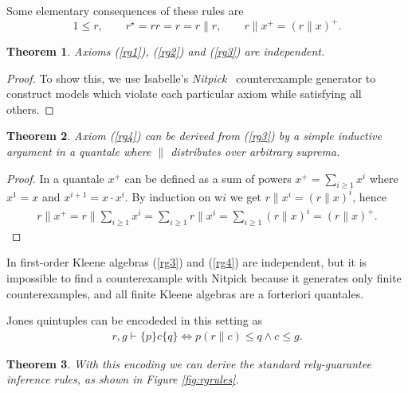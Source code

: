 \documentclass{llncs}
\newtheorem{thm}{Theorem}
\begin{document}
Some elementary consequences of these rules are
\begin{equation*}
1 \le r,\qquad
r^\star = rr = r = r\|r,\qquad
r\|x^+ = (r\|x)^+.
\end{equation*}

\begin{thm}
  Axioms (\ref{rg1}), (\ref{rg2}) and (\ref{rg3}) are independent.
\end{thm}
\begin{proof}
  To show this, we use Isabelle's
  \emph{Nitpick}~\cite{blanchette_nitpick:_2010} counterexample
  generator to construct models which violate each particular axiom
  while satisfying all others.
\end{proof}

\begin{thm}
Axiom (\ref{rg4}) can be derived from (\ref{rg3}) by a simple
inductive argument in a quantale where $\|$ distributes over arbitrary suprema.
\end{thm}
\begin{proof}
  In a quantale $x^+$ can be defined as a sum of powers
  $x^+=\sum_{i\ge 1} x^i$ where $x^1=x$ and $x^{i+1}=x\cdot x^i$. By
  induction on w$i$ we get $r\|x^i = (r\|x)^i$, hence
  \begin{align*}
    r\|x^+ = r\|\sum_{i\ge 1} x^i = \sum_{i\ge 1} r\|x^i = \sum_{i\ge 1} (r\|x)^i = (r\|x)^+.
  \end{align*}
\end{proof}

In first-order Kleene algebras (\ref{rg3}) and (\ref{rg4}) are
independent, but it is impossible to find a counterexample with
Nitpick because it generates only finite counterexamples, and all
finite Kleene algebras are a forteriori quantales.

Jones quintuples can be encodeded in this setting as
\begin{align}
r, g \vdash \{p\} c \{q\} \iff p(r\|c) \le q \land c \le g. \label{quin}
\end{align}

\begin{thm}
With this encoding we can derive the standard rely-guarantee inference
rules, as shown in Figure \ref{fig:rgrules}.
\end{thm}
\end{document}
